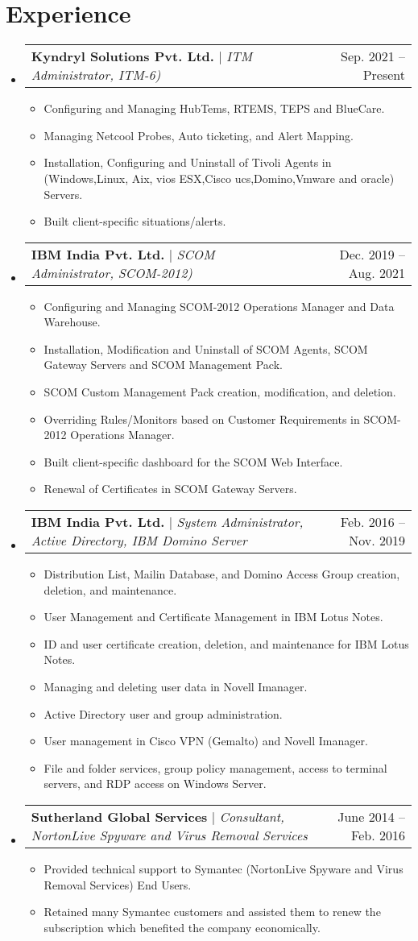 \documentclass[letterpaper, 10pt]{article}
\makeatletter
\newcommand{\resumeItem}[1]{
	\item\small{
		{#1 \vspace{-2pt}}
	}
}
\newcommand{\resumeProjectHeading}[2]{
	\item
	\begin{tabular*}{0.97\textwidth}{l@{\extracolsep{\fill}}r}
		\small#1 & #2 \\
	\end{tabular*}\vspace{-7pt}
}
\newcommand{\resumeSubHeadingListStart}{\begin{itemize}[leftmargin=0.15in, label={}]}
\newcommand{\resumeSubHeadingListEnd}{\end{itemize}}
\newcommand{\resumeItemListStart}{\begin{itemize}}
\newcommand{\resumeItemListEnd}{\end{itemize}\vspace{-5pt}}
\makeatother
\begin{document}
	\section{Experience}
	\resumeSubHeadingListStart
	
	\resumeProjectHeading
	{\textbf{Kyndryl Solutions Pvt. Ltd.} $|$ \footnotesize\emph{ITM Administrator, ITM-6)}}{Sep. 2021 -- Present}
	\resumeItemListStart
	\resumeItem{Configuring and Managing HubTems, RTEMS, TEPS and BlueCare.}
	\resumeItem{Managing Netcool Probes, Auto ticketing, and Alert Mapping.}
	\resumeItem{Installation, Configuring and Uninstall of Tivoli Agents in (Windows,Linux, Aix, vios ESX,Cisco ucs,Domino,Vmware and oracle) Servers.}
	\resumeItem{Built client-specific situations/alerts.}
	\resumeItemListEnd
	
	\resumeProjectHeading
	{\textbf{IBM India Pvt. Ltd.} $|$ \footnotesize\emph{SCOM Administrator, SCOM-2012)}}{Dec. 2019 -- Aug. 2021}
	\resumeItemListStart
	\resumeItem{Configuring and Managing SCOM-2012 Operations Manager and Data Warehouse.}	
	\resumeItem{Installation, Modification and Uninstall of SCOM Agents, SCOM Gateway Servers and  SCOM Management Pack.}
	\resumeItem{SCOM Custom Management Pack creation, modification, and deletion.}
	\resumeItem{Overriding Rules/Monitors based on Customer Requirements in SCOM-2012 Operations Manager.}
	\resumeItem{Built client-specific dashboard for the SCOM Web Interface.}
	\resumeItem{Renewal of Certificates in SCOM Gateway Servers.}	
	\resumeItemListEnd
	
	\resumeProjectHeading
	{\textbf{IBM India Pvt. Ltd.} $|$ \footnotesize\emph{System Administrator, Active Directory, IBM Domino Server}}{Feb. 2016 -- Nov. 2019}
	\resumeItemListStart
	\resumeItem{Distribution List, Mailin Database, and Domino Access Group creation, deletion, and maintenance.}
	\resumeItem{User Management and Certificate Management in IBM Lotus Notes.}
	\resumeItem{ID and user certificate creation, deletion, and maintenance for IBM Lotus Notes.}
	\resumeItem{Managing and deleting user data in Novell Imanager.}
	\resumeItem{Active Directory user and group administration.}
	\resumeItem{User management in Cisco VPN (Gemalto) and Novell Imanager.}
	\resumeItem{File and folder services, group policy management, access to terminal servers, and RDP access on Windows Server.}	
	\resumeItemListEnd
	
	\resumeProjectHeading
	{\textbf{Sutherland Global Services} $|$ \footnotesize\emph{Consultant, NortonLive Spyware and Virus Removal Services}}{June 2014 -- Feb. 2016}
	\resumeItemListStart
	\resumeItem{Provided technical support to Symantec (NortonLive Spyware and Virus Removal Services) End Users.}
	\resumeItem{Retained many Symantec customers and assisted them to renew the subscription which benefited the company economically.}
	\resumeItemListEnd
	\resumeSubHeadingListEnd
	
\end{document}

